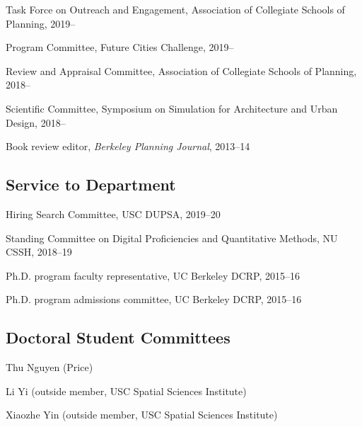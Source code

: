\documentclass[12pt,letterpaper]{report}
\newcommand{\listitemspace}{0.15em}
\renewenvironment{itemize}
{\begin{list}{}{\setlength{\leftmargin}{0em}
            \setlength{\parskip}{0em}
            \setlength{\itemsep}{\listitemspace}
            \setlength{\parsep}{\listitemspace}}}
    {\end{list}}
\begin{document}
    \begin{itemize}

        \item Task Force on Outreach and Engagement, Association of Collegiate Schools of Planning, 2019--
        
        \item Program Committee, Future Cities Challenge, 2019--

        \item Review and Appraisal Committee, Association of Collegiate Schools of Planning, 2018--

        \item Scientific Committee, Symposium on Simulation for Architecture and Urban Design, 2018--

        \item Book review editor, \textit{Berkeley Planning Journal}, 2013--14

    \end{itemize}

    \subsection*{Service to Department}

    \begin{itemize}
    	
    	\item Hiring Search Committee, USC DUPSA, 2019--20

        \item Standing Committee on Digital Proficiencies and Quantitative Methods, NU CSSH, 2018--19

        \item Ph.D. program faculty representative, UC Berkeley DCRP, 2015--16

        \item Ph.D. program admissions committee, UC Berkeley DCRP, 2015--16

    \end{itemize}
	
	\subsection*{Doctoral Student Committees}
	
	\begin{itemize}
		
		\item Thu Nguyen (Price)

		\item Li Yi (outside member, USC Spatial Sciences Institute)
		
		\item Xiaozhe Yin (outside member, USC Spatial Sciences Institute)
		
	\end{itemize}
\end{document}
